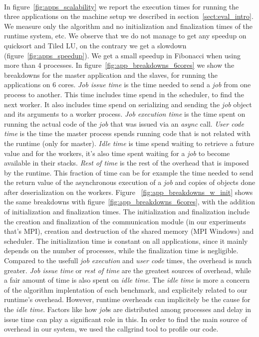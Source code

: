 \paragraph{}
	In figure~\ref{fig:apps_scalability} we report the execution times for running the three applications on the
machine setup we described in section~\ref{sect:eval_intro}.  We measure only the algorithm and no initialization
and finalization times of the runtime system, etc.
We observe that we do not manage to get any speedup 
on quicksort and Tiled LU, on the contrary we get a slowdown (figure~\ref{fig:apps_speedup}).
We get a small speedup in Fibonacci when using more than 4 processes.  
In figure~\ref{fig:app_breakdowns_6cores} 
we show the breakdowns for the master application and the slaves, for running the applications on 6 cores.
\emph{Job issue time} is the time needed to send a \emph{job} from one process to another. This time includes
time spend in the scheduler, to find the next worker.  It also includes time spend on serializing and sending 
the \emph{job} object and its arguments to a worker process.  \emph{Job execution time} is the time spent on 
running the actual code of the 
\emph{job} that was issued via an \emph{async} call.  \emph{User code time} is the time the master process spends
running code that is not related with the runtime (only for master).  
\emph{Idle time} is time spend waiting to retrieve a future 
value and for the workers, it's also time spent waiting for a \emph{job} to become available in their stacks.
\emph{Rest of time} is the rest of the overhead that is imposed by the runtime.  This fraction of time can be for 
example the time needed to send the return value of the asynchronous execution of a \emph{job} and copies
of objects done after deserialization on the workers.
Figure ~\ref{fig:app_breakdowns_w_init} shows the same breakdowns with figure~\ref{fig:app_breakdowns_6cores}, with 
the addition of initialization and finalization times.  The initialization and finalization include the 
creation and finalization of the communication module (in our experiments that's MPI), creation and destruction
of the shared memory (MPI Windows) and scheduler.  The initialization time is constant on all applications, since
it mainly depends on the number of processes, while the finalization time is negligible.
Compared to the usefull \emph{job execution} and \emph{user code} times, the overhead is much greater.
\emph{Job issue time} or \emph{rest of time} are the greatest sources of 
overhead, while a fair amount of time is also spent on \emph{idle time}.  The \emph{idle time} is more
a concern of the algorithm implentation of each benchmark, and explicitely related to our runtime's overhead.
However, runtime overheads can implicitely be the cause for the \emph{idle time}.  Factors like how \emph{job}s
are distributed among processes and delay in issue time can play a significant role in this.
In order to find the main source of overhead in our system, we used the callgrind tool
to profile our code.  

